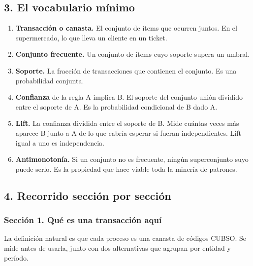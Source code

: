 \documentclass[11pt]{article}
\begin{document}
\subsection*{3. El vocabulario mínimo}
\begin{enumerate}
  \item \textbf{Transacción o canasta.} El conjunto de ítems que ocurren juntos. En el supermercado, lo que lleva un cliente en un ticket.
  \item \textbf{Conjunto frecuente.} Un conjunto de ítems cuyo soporte supera un umbral.
  \item \textbf{Soporte.} La fracción de transacciones que contienen el conjunto. Es una probabilidad conjunta.
  \item \textbf{Confianza} de la regla A implica B. El soporte del conjunto unión dividido entre el soporte de A. Es la probabilidad condicional de B dado A.
  \item \textbf{Lift.} La confianza dividida entre el soporte de B. Mide cuántas veces más aparece B junto a A de lo que cabría esperar si fueran independientes. Lift igual a uno es independencia.
  \item \textbf{Antimonotonía.} Si un conjunto no es frecuente, ningún superconjunto suyo puede serlo. Es la propiedad que hace viable toda la minería de patrones.
\end{enumerate}
\subsection*{4. Recorrido sección por sección}
\subsubsection*{Sección 1. Qué es una transacción aquí}
La definición natural es que cada proceso es una canasta de códigos CUBSO. Se mide antes de usarla, junto con dos alternativas que agrupan por entidad y período.
\end{document}
